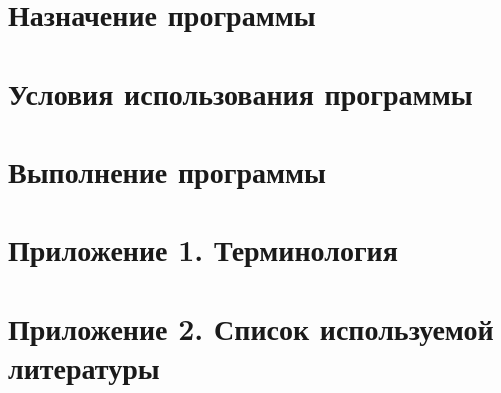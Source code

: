 \documentclass[
encoding=utf8
]{../twoeskd}
\begin{document}

% 

\newpage
{}
\tableofcontents

\newpage
\section{Назначение программы}


\newpage
\section{Условия использования программы}


\newpage
\section{Выполнение программы}


\newpage
\section{Приложение 1. Терминология}


\newpage
\section{Приложение 2. Список используемой литературы}



\newpage
\eskdListOfChanges

\end{document}
